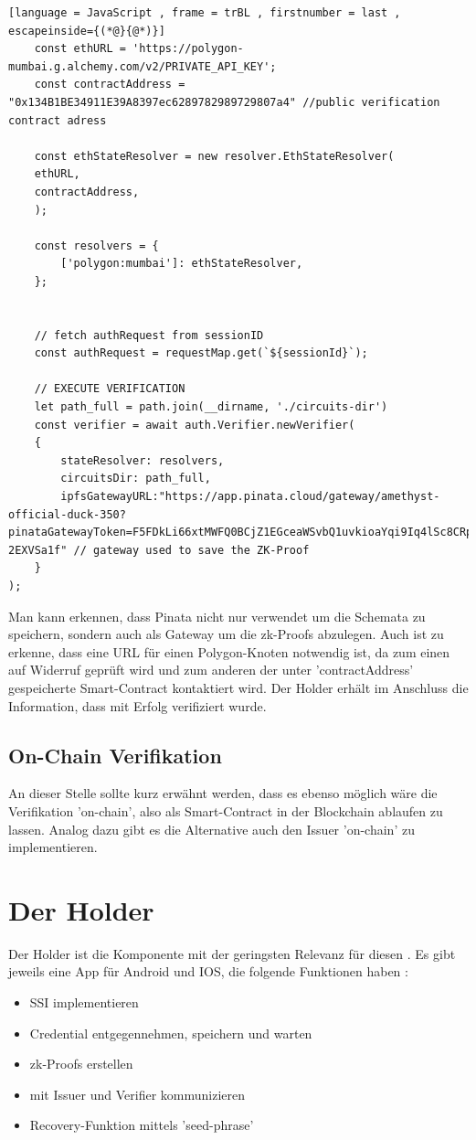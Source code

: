 \begin{lstlisting}[language = JavaScript , frame = trBL , firstnumber = last , escapeinside={(*@}{@*)}]
	const ethURL = 'https://polygon-mumbai.g.alchemy.com/v2/PRIVATE_API_KEY';
	const contractAddress = "0x134B1BE34911E39A8397ec6289782989729807a4" //public verification contract adress
	
	const ethStateResolver = new resolver.EthStateResolver(
	ethURL,
	contractAddress,
	);
	
	const resolvers = {
		['polygon:mumbai']: ethStateResolver,
	};
	
	
	// fetch authRequest from sessionID
	const authRequest = requestMap.get(`${sessionId}`);
	
	// EXECUTE VERIFICATION
	let path_full = path.join(__dirname, './circuits-dir')
	const verifier = await auth.Verifier.newVerifier(
	{
		stateResolver: resolvers,
		circuitsDir: path_full,
		ipfsGatewayURL:"https://app.pinata.cloud/gateway/amethyst-official-duck-350?pinataGatewayToken=F5FDkLi66xtMWFQ0BCjZ1EGceaWSvbQ1uvkioaYqi9Iq4lSc8CRpMi-2EXVSa1f" // gateway used to save the ZK-Proof
	}
);
\end{lstlisting}
Man kann erkennen, dass Pinata nicht nur verwendet um die Schemata zu speichern, sondern auch als Gateway um die zk-Proofs abzulegen. Auch ist zu erkenne, dass eine URL für einen Polygon-Knoten notwendig ist, da zum einen auf Widerruf geprüft wird und zum anderen der unter 'contractAddress' gespeicherte Smart-Contract kontaktiert wird. Der Holder erhält im Anschluss die Information, dass mit Erfolg verifiziert wurde.

\subsection{On-Chain Verifikation}
An dieser Stelle sollte kurz erwähnt werden, dass es ebenso möglich wäre die Verifikation 'on-chain', also als Smart-Contract in der Blockchain ablaufen zu lassen. Analog dazu gibt es die Alternative auch den Issuer 'on-chain' zu implementieren.

\section{Der Holder}
Der Holder ist die Komponente mit der geringsten Relevanz für diesen . Es gibt jeweils eine App für Android und IOS, die folgende Funktionen haben \cite{ID58}:
\begin{itemize}
	\item SSI implementieren
	\item Credential entgegennehmen, speichern und warten
	\item zk-Proofs erstellen
	\item mit Issuer und Verifier kommunizieren
	\item Recovery-Funktion mittels 'seed-phrase'
\end{itemize}

